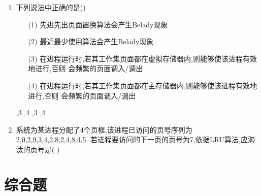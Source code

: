 \documentclass[12pt, a4paper, oneside, UTF8]{ctexbook}
\begin{document}
\begin{enumerate}
    \item 下列说法中正确的是() 
    \begin{enumerate}
        \item [(1)] 先进先出页面置换算法会产生Belady现象
        \item [(2)] 最近最少使用算法会产生Belady现象
        \item [(3)] 在进程运行时,若其工作集页面都在虚拟存储器内,则能够使该进程有效地进行,否则
        会频繁的页面调入/调出
        \item [(4)] 在进程运行时,若其工作集页面都在主存储器内,则能够使该进程有效地进行,否则
        会频繁的页面调入/调出
    \end{enumerate}
    \begin{choices}
        ,3
        ,4
        ,3
        ,4
    \end{choices}

    \item \bl 系统为某进程分配了4个页框,该进程已访问的页号序列为\underline{2,0,2,9,3,4,2,8,2,4,8.4.5}.
    若进程要访问的下一页的页号为7,依据LRU算法,应淘汰的页号是(   ) 

\end{enumerate}

\section{综合题}
\ifx\allfiles\undefined
\end{document}
